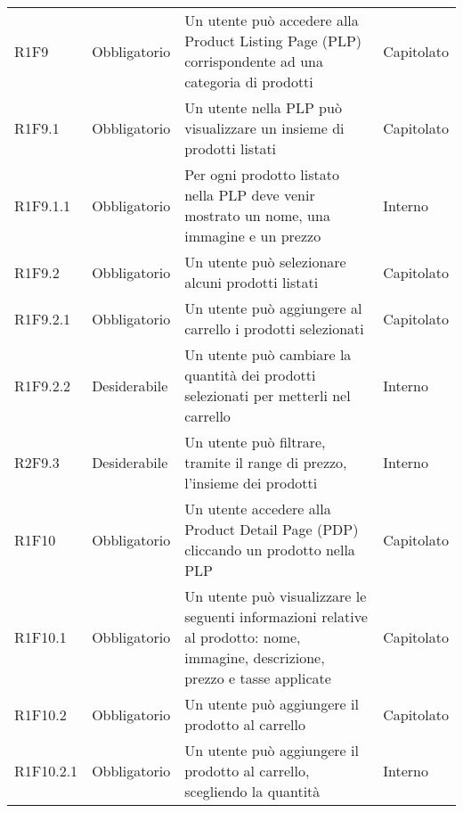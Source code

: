 {\begin{longtable}{C{2.5cm} C{2.8cm} C{6.7cm} C{2.5cm}}
R1F9 & Obbligatorio & Un utente può accedere alla Product Listing Page (PLP) corrispondente ad una categoria di prodotti & Capitolato \\
R1F9.1 & Obbligatorio & Un utente nella PLP può visualizzare un insieme di prodotti listati & Capitolato \\
R1F9.1.1 & Obbligatorio & Per ogni prodotto listato nella PLP deve venir mostrato un nome, una immagine e un prezzo & Interno \\
R1F9.2 & Obbligatorio & Un utente può selezionare alcuni prodotti listati & Capitolato \\
R1F9.2.1 & Obbligatorio & Un utente può aggiungere al carrello i prodotti selezionati & Capitolato \\
R1F9.2.2 & Desiderabile & Un utente può cambiare la quantità dei prodotti selezionati per metterli nel carrello & Interno \\
R2F9.3 & Desiderabile & Un utente può filtrare, tramite il range di prezzo, l'insieme dei prodotti & Interno \\


R1F10 & Obbligatorio & Un utente accedere alla Product Detail Page (PDP) cliccando un prodotto nella PLP & Capitolato \\
R1F10.1 & Obbligatorio & Un utente può visualizzare le seguenti informazioni relative al prodotto: nome, immagine, descrizione, prezzo e tasse applicate & Capitolato \\
R1F10.2 & Obbligatorio & Un utente può aggiungere il prodotto al carrello & Capitolato \\
R1F10.2.1 & Obbligatorio & Un utente può aggiungere il prodotto al carrello, scegliendo la quantità & Interno \\

\end{longtable}

}
